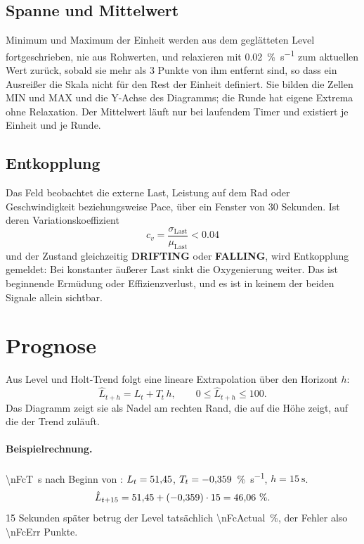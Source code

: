 \documentclass[11pt,a4paper]{article}
\newcommand{\st}[2]{\textcolor{#1}{\textbf{#2}}}
\newcommand{\DRIFTING}{\st{drifting}{DRIFTING}}
\newcommand{\FALLING}{\st{falling}{FALLING}}
\newcommand{\pers}{\si{\percent\per\second}}
\begin{document}
\subsection{Spanne und Mittelwert}

Minimum und Maximum der Einheit werden aus dem geglätteten Level
fortgeschrieben, nie aus Rohwerten, und relaxieren mit \num{0.02}~\pers{} zum
aktuellen Wert zurück, sobald sie mehr als 3 Punkte von ihm entfernt sind, so
dass ein Ausreißer die Skala nicht für den Rest der Einheit definiert. Sie
bilden die Zellen MIN und MAX und die Y-Achse des Diagramms; die Runde hat
eigene Extrema ohne Relaxation. Der Mittelwert läuft nur bei laufendem Timer
und existiert je Einheit und je Runde.

\subsection{Entkopplung}

Das Feld beobachtet die externe Last, Leistung auf dem Rad oder Geschwindigkeit
beziehungsweise Pace, über ein Fenster von 30 Sekunden. Ist deren
Variationskoeffizient
\begin{equation}
  c_v = \frac{\sigma_{\mathrm{Last}}}{\mu_{\mathrm{Last}}} < \num{0.04}
\end{equation}
und der Zustand gleichzeitig \DRIFTING{} oder \FALLING{}, wird Entkopplung
gemeldet: Bei konstanter äußerer Last sinkt die Oxygenierung weiter. Das ist
beginnende Ermüdung oder Effizienzverlust, und es ist in keinem der beiden
Signale allein sichtbar.

\section{Prognose}
\label{sec:forecast}

Aus Level und Holt-Trend folgt eine lineare Extrapolation über den Horizont $h$:
\begin{equation}
  \hat L_{t+h} = L_t + T_t \, h, \qquad 0 \le \hat L_{t+h} \le 100.
  \label{eq:forecast}
\end{equation}
Das Diagramm zeigt sie als Nadel am rechten Rand, die auf die Höhe zeigt, auf
die der Trend zuläuft.

\paragraph{Beispielrechnung.}
\SI{\nFcT}{\second} nach Beginn von \nFcLap{}: $L_t = \num{51.45}$,
$T_t = \num{-0.359}$~\pers, $h = \SI{15}{\second}$.
\begin{equation*}
  \hat L_{t+15} = \num{51.45} + (\num{-0.359}) \cdot 15 = \num{46.06}~\si{\percent}.
\end{equation*}
15 Sekunden später betrug der Level tatsächlich \SI{\nFcActual}{\percent}, der
Fehler also \num{\nFcErr} Punkte.
\end{document}
